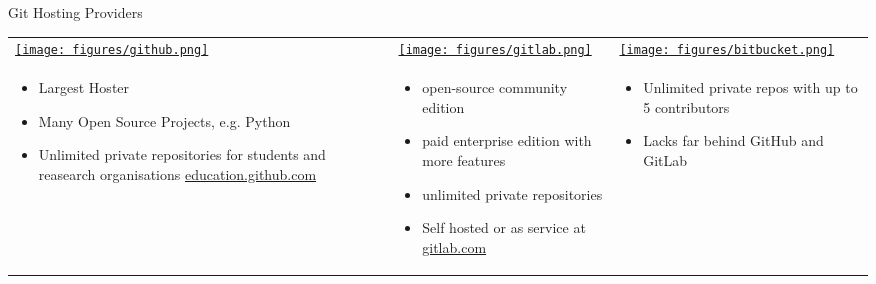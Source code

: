 \begin{frame}[t]{Git Hosting Providers}
  \small
  \begin{tabu}{@{} X[,C] @{} X[,C] @{} X[,C] @{}}
    \href{https://github.com}{\texttt{[image: figures/github.png]}} &
    \href{https://gitlab.com}{\texttt{[image: figures/gitlab.png]}} &
    \href{https://bitbucket.org}{\texttt{[image: figures/bitbucket.png]}} \\
    \begin{itemize}
      \item Largest Hoster
      \item Many Open Source Projects, e.g. Python
      \item Unlimited private repositories for students and reasearch organisations
        \href{https://education.github.com}{education.github.com}
    \end{itemize}
    &
    \begin{itemize}
      \item open-source community edition
      \item paid enterprise edition with more features
      \item unlimited private repositories
      \item Self hosted or as service at \href{https://gitlab.com}{gitlab.com}
    \end{itemize}
    &
    \begin{itemize}
      \item Unlimited private repos with up to 5 contributors
      \item Lacks far behind GitHub and GitLab
    \end{itemize}
  \end{tabu}
  \vspace{-1ex}
  \begin{center}%
  \end{center}%
\end{frame}

